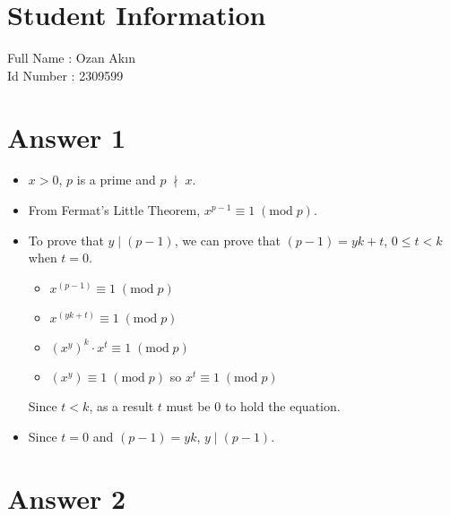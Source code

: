 \documentclass[12pt]{article}
\begin{document}
\section*{Student Information } 
Full Name : Ozan Akın \\
Id Number : 2309599 \\

\section*{Answer 1}

\begin{itemize}
    \item $x > 0$, $p$ is a prime and $p \; \nmid \; x$.
    \item From Fermat's Little Theorem, $x^{p - 1} \equiv 1 \; (\text{mod} \; p)$.
    \item To prove that $y \mid (p - 1)$, we can prove that $(p - 1) = yk + t$, $0 \leq t < k$ when $t = 0$.
        \begin{itemize}[label={}]
            \item $x^{(p - 1)} \equiv 1 \; (\text{mod} \; p)$
            \item $x^{(yk + t)} \equiv 1 \; (\text{mod} \; p)$
            \item $(x^y)^k \cdot x^t \equiv 1 \; (\text{mod} \; p)$
            \item $(x^y) \equiv 1 \; (\text{mod} \; p)$ so $x^t \equiv 1 \; (\text{mod} \; p)$
        \end{itemize}{}
        Since $t < k$, as a result $t$ must be $0$ to hold the equation.
    \item Since $t = 0$ and $(p - 1) = yk$, $y \mid (p - 1)$.
\end{itemize}{}

\section*{Answer 2}
\end{document}
